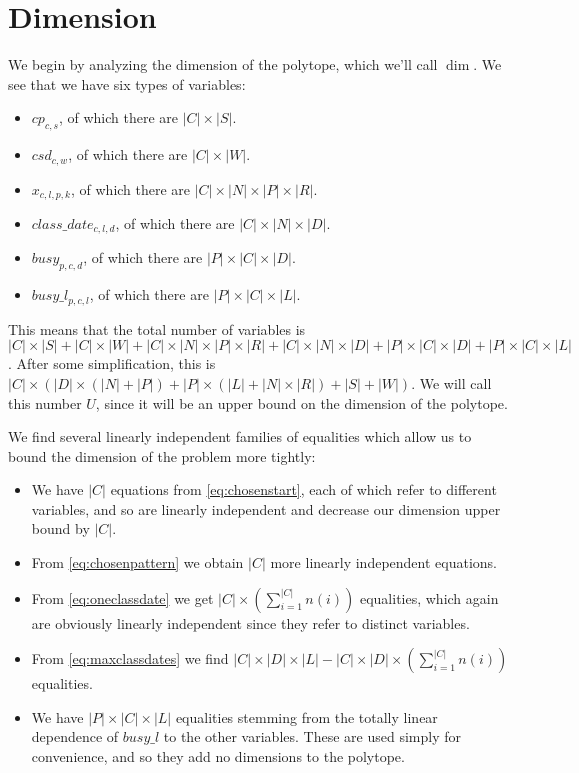 \section{Dimension}

We begin by analyzing the dimension of the polytope, which we'll call $\dim$. We see that we have six types of variables:
\begin{itemize}
\item $cp_{c, s}$, of which there are $|C| \times |S|$.
\item $csd_{c, w}$, of which there are $|C| \times |W|$.
\item $x_{c, l, p, k}$, of which there are $|C| \times |N| \times |P| \times |R|$.
\item $class\_date_{c, l, d}$, of which there are $|C| \times |N| \times |D|$.
\item $busy_{p, c, d}$, of which there are $|P| \times |C| \times |D|$.
\item $busy\_l_{p, c, l}$, of which there are $|P| \times |C| \times |L|$.
\end{itemize}

This means that the total number of variables is $|C| \times |S| + |C| \times |W| + |C| \times |N| \times |P| \times |R| + |C| \times |N| \times |D| + |P| \times |C| \times |D| + |P| \times |C| \times |L|$. After some simplification, this is $|C| \times (|D| \times (|N| + |P|) + |P| \times (|L| + |N| \times |R|) + |S| + |W|)$. We will call this number $U$, since it will be an upper bound on the dimension of the polytope.


We find several linearly independent families of equalities which allow us to bound the dimension of the problem more tightly:
\begin{itemize}
\item We have $|C|$ equations from \ref{eq:chosenstart}, each of which refer to different variables, and so are linearly independent and decrease our dimension upper bound by $|C|$.
\item From \ref{eq:chosenpattern} we obtain $|C|$ more linearly independent equations.
\item From \ref{eq:oneclassdate} we get $|C| \times (\sum_{i = 1}^{|C|} n(i))$ equalities, which again are obviously linearly independent since they refer to distinct variables.
\item From \ref{eq:maxclassdates} we find $|C| \times |D| \times |L| - |C| \times |D| \times (\sum_{i = 1}^{|C|} n(i))$ equalities.
\item We have $|P| \times |C| \times |L|$ equalities stemming from the totally linear dependence of $busy\_l$ to the other variables. These are used simply for convenience, and so they add no dimensions to the polytope.
\end{itemize}

